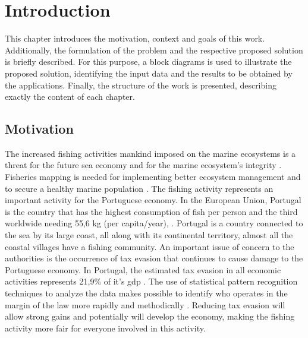 

% 
% 
%
\chapter{Introduction}
\label{cha:introduction}
This chapter introduces the motivation, context and goals of this work. 
Additionally, the formulation of the problem and the respective proposed solution is briefly described. For this purpose, a block diagrams is used to illustrate the proposed solution, identifying the input data and the results to be obtained by the applications.
Finally, the structure of the work is presented, describing exactly the content of each chapter.

\section{Motivation} %
\label{sec:motivation}

The increased fishing activities mankind imposed on the marine ecosystems is a threat for the future sea economy and for the marine ecosystem's integrity \cite{AgardyEffects}.\\
Fisheries mapping is needed for implementing better ecosystem management and to secure a healthy marine population \cite{AlfredImperative}.
The fishing activity represents an important activity for the Portuguese economy. In the European Union, Portugal is the country that has the highest consumption of fish per person and the third worldwide needing 55,6 kg (per capita/year), \cite{WEBSITE:ConsumoPescasPortugal}. Portugal is a country connected to the sea by its large coast, all along with its continental territory, almost all the coastal villages have a fishing community.
An important issue of concern to the authorities is the occurrence of tax evasion that continues to cause damage to the Portuguese economy. In Portugal, the estimated tax evasion in all economic activities represents 21,9\% of it's \gls{gdp} \cite{BOOK:EsbocoFraude}.
The use of statistical pattern recognition techniques to analyze the data makes possible to identify who operates in the margin of the law more rapidly and methodically \cite{ShuklaBigData}. Reducing tax evasion will allow strong gains and potentially will develop the economy, making the fishing activity more fair for everyone involved in this activity.

